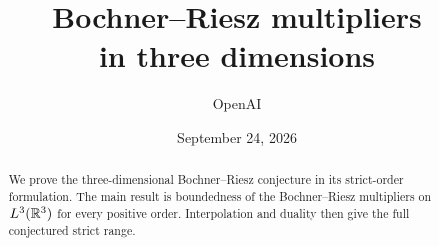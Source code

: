 \documentclass[11pt]{article}
\title{Bochner--Riesz multipliers\\in three dimensions}
\author{OpenAI}
\date{September 24, 2026}
\theoremstyle{definition}
\theoremstyle{remark}
\numberwithin{equation}{section}
\begin{document}
\maketitle
\begin{abstract}
We prove the three-dimensional Bochner--Riesz conjecture in its
strict-order formulation. The main result is boundedness of the
Bochner--Riesz multipliers on $L^3(\mathbb R^3)$ for every positive order.
Interpolation and duality then give the full conjectured strict range.
\end{abstract}
\tableofcontents
\clearpage












\begingroup
\raggedright
{}


\endgroup
\end{document}
